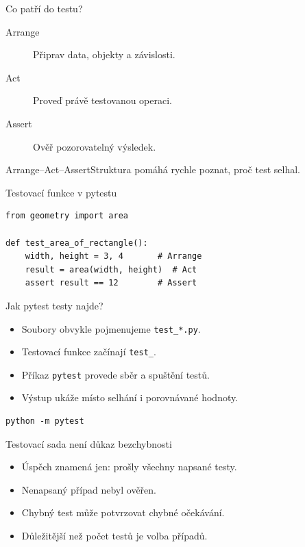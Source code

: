 \documentclass[aspectratio=169]{beamer}
\begin{document}
\begin{frame}{Co patří do testu?}
\begin{description}
\item[Arrange] Připrav data, objekty a závislosti.
\item[Act] Proveď právě testovanou operaci.
\item[Assert] Ověř pozorovatelný výsledek.
\end{description}
\begin{block}{Arrange--Act--Assert}Struktura pomáhá rychle poznat, proč test selhal.\end{block}
\end{frame}

\begin{frame}[fragile]{Testovací funkce v pytestu}
\begin{lstlisting}[style=python]
from geometry import area

def test_area_of_rectangle():
    width, height = 3, 4       # Arrange
    result = area(width, height)  # Act
    assert result == 12        # Assert
\end{lstlisting}
\end{frame}

\begin{frame}[fragile]{Jak pytest testy najde?}
\begin{itemize}
\item Soubory obvykle pojmenujeme \texttt{test\_*.py}.
\item Testovací funkce začínají \texttt{test\_}.
\item Příkaz \texttt{pytest} provede sběr a spuštění testů.
\item Výstup ukáže místo selhání i porovnávané hodnoty.
\end{itemize}
\begin{lstlisting}[basicstyle=\ttfamily\large]
python -m pytest
\end{lstlisting}
\end{frame}

\begin{frame}{Testovací sada není důkaz bezchybnosti}
\begin{itemize}
\item Úspěch znamená jen: prošly všechny napsané testy.
\item Nenapsaný případ nebyl ověřen.
\item Chybný test může potvrzovat chybné očekávání.
\item Důležitější než počet testů je volba případů.
\end{itemize}
\end{frame}
\end{document}
